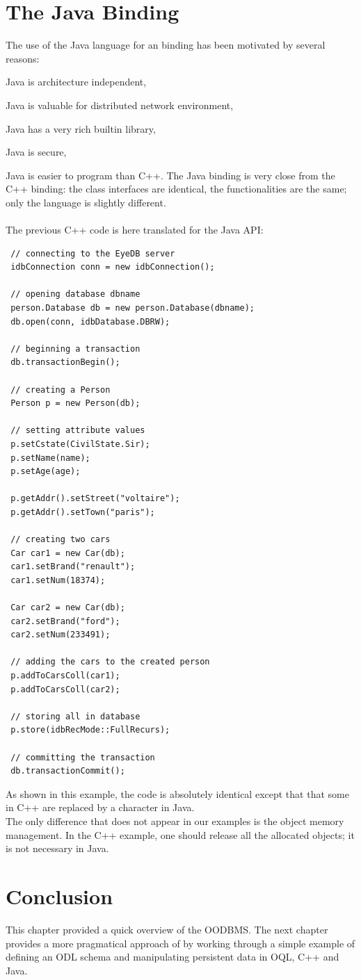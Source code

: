 \section{The Java Binding}
The use of the Java language for an \eyedb binding has been motivated by
several reasons:
\be
\item Java is architecture independent,
\item Java is valuable for distributed network environment,
\item Java has a very rich builtin library,
\item Java is secure,
\item Java is easier to program than C++.
\ee
The Java binding is very close from the C++ binding: the
class interfaces are identical, the functionalities
are the same; only the language is slightly different.
\\
\\
The previous C++ code is here translated for the \eyedb Java API:
{\verbsize
\begin{verbatim}
 // connecting to the EyeDB server
 idbConnection conn = new idbConnection();

 // opening database dbname
 person.Database db = new person.Database(dbname);
 db.open(conn, idbDatabase.DBRW);

 // beginning a transaction
 db.transactionBegin();

 // creating a Person
 Person p = new Person(db);

 // setting attribute values
 p.setCstate(CivilState.Sir);
 p.setName(name);
 p.setAge(age);

 p.getAddr().setStreet("voltaire");
 p.getAddr().setTown("paris");

 // creating two cars
 Car car1 = new Car(db);
 car1.setBrand("renault");
 car1.setNum(18374);

 Car car2 = new Car(db);
 car2.setBrand("ford");
 car2.setNum(233491);

 // adding the cars to the created person
 p.addToCarsColl(car1);
 p.addToCarsColl(car2);

 // storing all in database
 p.store(idbRecMode::FullRecurs);

 // committing the transaction
 db.transactionCommit();
\end{verbatim}
}
As shown in this example, the code is absolutely identical except
that that some \ttv{->} in C++ are replaced by a  character
in Java.
\\
The only difference that does not appear in our examples is the
object memory management. In the C++ example, one should release
all the allocated objects; it is not necessary in Java.
\section{Conclusion}
This chapter provided a quick overview of the \eyedb OODBMS. The next
chapter provides a more pragmatical approach of \eyedb by working through 
a simple
example of defining an ODL schema and manipulating persistent data in OQL,
C++ and Java.


